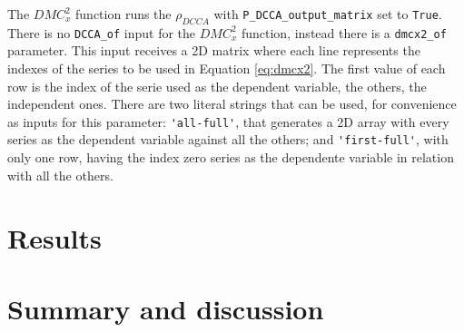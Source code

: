 \documentclass[article]{jss}
\begin{document}
The $DMC_x^2$ function runs the $\rho_{DCCA}$ with \verb"P_DCCA_output_matrix" set to \verb"True". There is no \verb"DCCA_of" input for the $DMC_x^2$ function, instead there is a \verb"dmcx2_of" parameter. This input receives a 2D matrix where each line represents the indexes of the series to be used in Equation \ref{eq:dmcx2}. The first value of each row is the index of the serie used as the dependent variable, the others, the independent ones. There are two literal strings that can be used, for convenience as inputs for this parameter: \verb"'all-full'", that generates a 2D array with every series as the dependent variable against all the others; and \verb"'first-full'", with only one row, having the index zero series as the dependente variable in relation with all the others.








\section{Results} \label{sec:results}





\section{Summary and discussion} \label{sec:summary}



\end{document}
